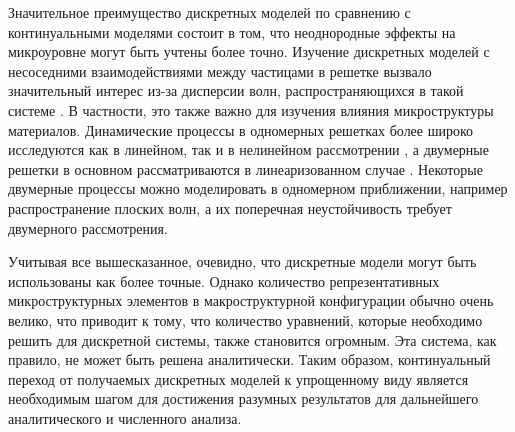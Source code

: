 Значительное преимущество дискретных моделей по сравнению с континуальными моделями состоит в том, что неоднородные эффекты на микроуровне могут быть учтены более точно. Изучение дискретных моделей с несоседними взаимодействиями между частицами в решетке вызвало значительный интерес из-за дисперсии волн, распространяющихся в такой системе \cite{AskMetr, Maug, Manev, Andrianov, Kosev, Mich, erem}. В частности, это также важно для изучения влияния микроструктуры материалов. Динамические процессы в одномерных решетках более широко исследуются как в линейном, так и в нелинейном рассмотрении \cite{Ostoja, Maug}, а двумерные решетки в основном рассматриваются в линеаризованном случае \cite{AskMetr, Ostoja, Tov}. Некоторые двумерные процессы можно моделировать в одномерном приближении, например распространение плоских волн, а их поперечная неустойчивость требует двумерного рассмотрения. 

Учитывая все вышесказанное, очевидно, что дискретные модели могут быть использованы как более точные. Однако количество репрезентативных микроструктурных элементов в макроструктурной конфигурации обычно очень велико, что приводит к тому, что количество уравнений, которые необходимо решить для дискретной системы, также становится огромным. Эта система, как правило, не может быть решена аналитически. Таким образом, континуальный переход от получаемых дискретных моделей к упрощенному виду является необходимым шагом для достижения разумных результатов для дальнейшего аналитического и численного анализа.
	
